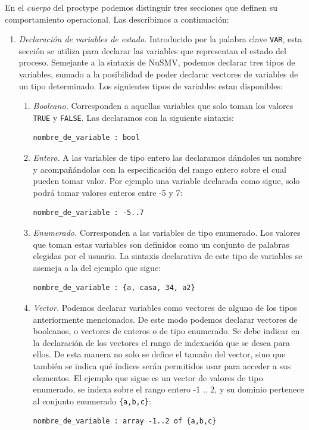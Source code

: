 \documentclass[titlepage, 12pt]{book}
\begin{document}
En el \textit{cuerpo} del proctype podemos distinguir tres secciones que definen su comportamiento operacional. Las describimos a continuaci\'on:
\begin{enumerate}
\item \textit{Declaraci\'on de variables de estado.} Introducido por la palabra clave \texttt{VAR}, esta secci\'on se utiliza para declarar las variables que representan el estado del proceso. Semejante a la sintaxis de NuSMV, podemos declarar tres tipos de variables, sumado a la posibilidad de poder declarar vectores de variables de un tipo determinado. Los siguientes tipos de variables estan disponibles:
\begin{enumerate}
\item \textit{Booleano.} Corresponden a aquellas variables que solo toman los valores \texttt{TRUE} y \texttt{FALSE}. Las declaramos con la siguiente sintaxis: \begin{verbatim}nombre_de_variable : bool\end{verbatim}
\item \textit{Entero.} A las variables de tipo entero las declaramos d\'andoles un nombre y acompa\~n\'andolas con la especificaci\'on del rango entero sobre el cual pueden tomar valor. Por ejemplo una variable declarada como sigue, solo podr\'a tomar valores enteros entre -5 y 7: \begin{verbatim}nombre_de_variable : -5..7\end{verbatim}
\item \textit{Enumerado.} Corresponden a las variables de tipo enumerado. Los valores que toman estas variables son definidos como un conjunto de palabras elegidas por el usuario. La sintaxis declarativa de este tipo de variables se asemeja a la del ejemplo que sigue: \begin{verbatim}nombre_de_variable : {a, casa, 34, a2}\end{verbatim}
\item \textit{Vector.} Podemos declarar variables como vectores de alguno de los tipos anteriormente mencionados. De este modo podemos declarar vectores de booleanos, o vectores de enteros o de tipo enumerado. Se debe indicar en la declaraci\'on de los vectores el rango de indexaci\'on que se desea para ellos. De esta manera no solo se define el tama\~no del vector, sino que tambi\'en se indica qu\'e \'indices ser\'an permitidos usar para acceder a sus elementos. El ejemplo que sigue es un vector de valores de tipo enumerado, se indexa sobre el rango entero -1 .. 2, y su dominio pertenece al conjunto enumerado \texttt{\{a,b,c\}}: \begin{verbatim}nombre_de_variable : array -1..2 of {a,b,c}\end{verbatim}
\end{enumerate}


\end{enumerate}
\end{document}
